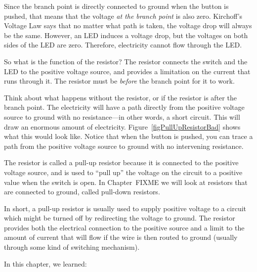 Since the branch point is directly connected to ground when the button is pushed, that means that the voltage \emph{at the branch point} is also zero.
Kirchoff's Voltage Law says that no matter what path is taken, the voltage drop will always be the same.
However, an LED induces a voltage drop, but the voltages on both sides of the LED are zero.
Therefore, electricity cannot flow through the LED.

So what is the function of the resistor?
The resistor connects the switch and the LED to the positive voltage source, and provides a limitation on the current that runs through it.
The resistor must be \emph{before} the branch point for it to work.

Think about what happens without the resistor, or if the resistor is after the branch point.
The electricity will have a path directly from the positive voltage source to ground with no resistance---in other words, a short circuit.
This will draw an enormous amount of electricity.
Figure~\ref{figPullUpResistorBad} shows what this would look like.
Notice that when the button is pushed, you can trace a path from the positive voltage source to ground with no intervening resistance.


The resistor is called a pull-up resistor because it is connected to the positive voltage source, and is used to ``pull up'' the voltage on the circuit to a positive value when the switch is open.
In Chapter~FIXME we will look at resistors that are connected to ground, called pull-down resistors.

In short, a pull-up resistor is usually used to supply positive voltage to a circuit which might be turned off by redirecting the voltage to ground.
The resistor provides both the electrical connection to the positive source and a limit to the amount of current that will flow if the wire is then routed to ground (usually through some kind of switching mechanism).

\reviewsection

In this chapter, we learned:


